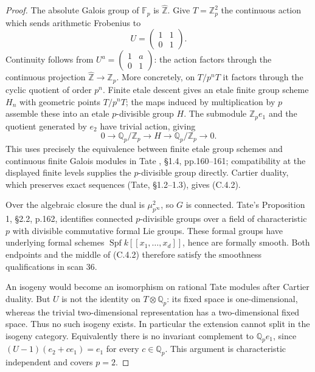 \begin{proof}
The absolute Galois group of $\mathbb F_p$ is $\widehat{\mathbb Z}$.
Give $T=\mathbb Z_p^2$ the continuous action which sends arithmetic
Frobenius to
\[
 U=\begin{pmatrix}1&1\\0&1\end{pmatrix}.
\]
Continuity follows from $U^a=\left(\begin{smallmatrix}1&a\\0&1\end{smallmatrix}\right)$:
the action factors through the continuous projection
$\widehat{\mathbb Z}\to\mathbb Z_p$. More concretely, on
$T/p^nT$ it factors through the cyclic quotient of order $p^n$.
Finite etale descent gives an etale finite group scheme $H_n$ with geometric
points $T/p^nT$; the maps induced by multiplication by $p$ assemble these
into an etale $p$-divisible group $H$. The submodule $\mathbb Z_pe_1$ and
the quotient generated by $e_2$ have trivial action, giving
\[
 0\to\mathbb Q_p/\mathbb Z_p\to H\to\mathbb Q_p/\mathbb Z_p\to0.
\]
This uses precisely the equivalence between finite etale group schemes and
continuous finite Galois modules in Tate \cite{C-Tate1967}, \S1.4,
pp.160--161; compatibility at the displayed finite levels supplies the
$p$-divisible group directly. Cartier duality, which preserves exact
sequences (Tate, \S1.2--1.3), gives (C.4.2).

Over the algebraic closure the dual is $\mu_{p^\infty}^2$, so $G$ is
connected. Tate's Proposition 1, \S2.2, p.162, identifies connected
$p$-divisible groups over a field of characteristic $p$ with divisible
commutative formal Lie groups. These formal groups have underlying formal
schemes $\operatorname{Spf}k[[x_1,\ldots,x_d]]$, hence are formally smooth.
Both endpoints and the middle of (C.4.2) therefore satisfy the smoothness
qualifications in scan 36.

An isogeny would become an isomorphism on rational Tate modules after
Cartier duality. But $U$ is not the identity on $T\otimes\mathbb Q_p$:
its fixed space is one-dimensional, whereas the trivial two-dimensional
representation has a two-dimensional fixed space. Thus no such isogeny
exists. In particular the extension cannot split in the isogeny category.
Equivalently there is no invariant complement to $\mathbb Q_pe_1$, since
$(U-1)(e_2+ce_1)=e_1$ for every $c\in\mathbb Q_p$.
This argument is characteristic independent and covers $p=2$.
\end{proof}

